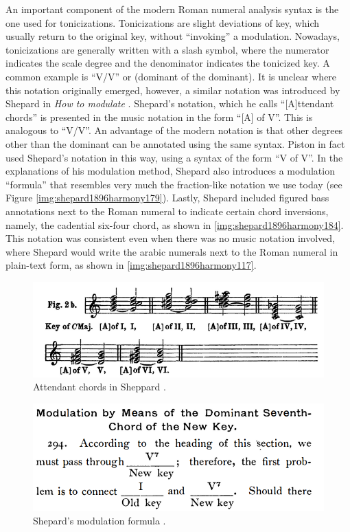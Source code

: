 An important component of the modern Roman numeral analysis syntax is the one used for tonicizations.
Tonicizations are slight deviations of key, which usually return to the original key, without ``invoking'' a modulation.
Nowadays, tonicizations are generally written with a slash symbol, where the numerator indicates the scale degree and the denominator indicates the tonicized key.
A common example is ``V/V'' or (dominant of the dominant).
It is unclear where this notation originally emerged, however, a similar notation was introduced by Shepard in \emph{How to modulate} \cite{shepard1889how}.
Shepard's notation, which he calls ``[A]ttendant chords'' is presented in the music notation in the form ``[A] of V''.
This is analogous to ``V/V''.
An advantage of the modern notation is that other degrees other than the dominant can be annotated using the same syntax.
Piston in fact used Shepard's notation in this way, using a syntax of the form ``V of V''.
In the explanations of his modulation method, Shepard also introduces a modulation ``formula'' that resembles very much the fraction-like notation we use today (see Figure \ref{img:shepard1896harmony179}).
Lastly, Shepard included figured bass annotations next to the Roman numeral to indicate certain chord inversions, namely, the cadential six-four chord, as shown in \ref{img:shepard1896harmony184}.
This notation was consistent even when there was no music notation involved, where Shepard would write the arabic numerals next to the Roman numeral in plain-text form, as shown in \ref{img:shepard1896harmony117}.

\begin{figure}
    \centering
    \includegraphics[width=\textwidth]{figures/chapter/2/primary_sources/shepard1889how005.png}
    \caption{Attendant chords in Sheppard \cite{shepard1889how}.}
    \label{fig:shepard1889how005}
\end{figure}

\begin{figure}
    \centering
    \includegraphics[width=\textwidth]{figures/chapter/2/primary_sources/shepard1896harmony179.png}
    \caption{Shepard's modulation formula \cite{shepard1896harmony}.}
    \label{fig:shepard1896harmony179}
\end{figure}

